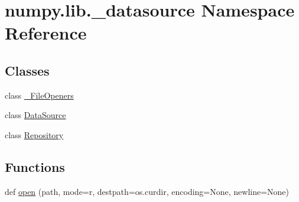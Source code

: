 \hypertarget{namespacenumpy_1_1lib_1_1__datasource}{}\section{numpy.\+lib.\+\_\+datasource Namespace Reference}
\label{namespacenumpy_1_1lib_1_1__datasource}
\subsection*{Classes}
\begin{DoxyCompactItemize}
\item 
class \hyperlink{classnumpy_1_1lib_1_1__datasource_1_1__FileOpeners}{\+\_\+\+File\+Openers}
\item 
class \hyperlink{classnumpy_1_1lib_1_1__datasource_1_1DataSource}{Data\+Source}
\item 
class \hyperlink{classnumpy_1_1lib_1_1__datasource_1_1Repository}{Repository}
\end{DoxyCompactItemize}
\subsection*{Functions}
\begin{DoxyCompactItemize}
\item 
def \hyperlink{namespacenumpy_1_1lib_1_1__datasource_a31cb95875384c18d75b818588d65d980}{open} (path, mode=\textquotesingle{}r\textquotesingle{}, destpath=os.\+curdir, encoding=None, newline=None)
\end{DoxyCompactItemize}


